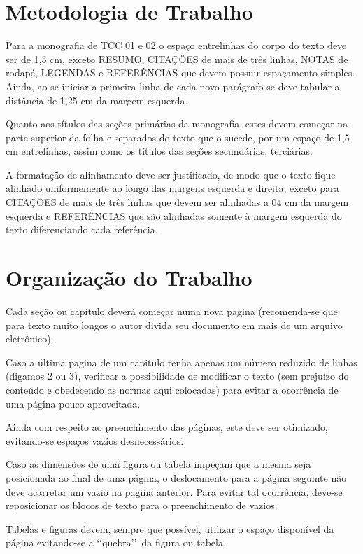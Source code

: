 \section{Metodologia de Trabalho}

Para a monografia de TCC 01 e 02 o espaço entrelinhas do corpo do texto 
deve ser de 1,5 cm, exceto RESUMO, CITAÇÔES de mais de três linhas, NOTAS 
de rodapé, LEGENDAS e REFERÊNCIAS que devem possuir espaçamento simples. 
Ainda, ao se iniciar a primeira linha de cada novo parágrafo se deve 
tabular a distância de 1,25 cm da margem esquerda.

Quanto aos títulos das seções primárias da monografia, estes devem começar 
na parte superior da folha e separados do texto que o sucede, por um espaço 
de 1,5 cm entrelinhas, assim como os títulos das seções secundárias, 
terciárias. 

A formatação de alinhamento deve ser justificado, de modo que o texto fique 
alinhado uniformemente ao longo das margens esquerda e direita, exceto para 
CITAÇÕES de mais de três linhas que devem ser alinhadas a 04 cm da margem 
esquerda e REFERÊNCIAS que são alinhadas somente à margem esquerda do texto 
diferenciando cada referência.

\section{Organização do Trabalho}

Cada seção ou capítulo deverá começar numa nova pagina (recomenda-se que 
para texto muito longos o autor divida seu documento em mais de um arquivo 
eletrônico). 

Caso a última pagina de um capitulo tenha apenas um número reduzido de 
linhas (digamos 2 ou 3), verificar a possibilidade de modificar o texto 
(sem prejuízo do conteúdo e obedecendo as normas aqui colocadas) para 
evitar a ocorrência de uma página pouco aproveitada.

Ainda com respeito ao preenchimento das páginas, este deve ser otimizado, 
evitando-se espaços vazios desnecessários. 

Caso as dimensões de uma figura ou tabela impeçam que a mesma seja 
posicionada ao final de uma página, o deslocamento para a página seguinte 
não deve acarretar um vazio na pagina anterior. Para evitar tal ocorrência, 
deve-se reposicionar os blocos de texto para o preenchimento de vazios. 

Tabelas e figuras devem, sempre que possível, utilizar o espaço disponível 
da página evitando-se a \lq\lq quebra\rq\rq\ da figura ou tabela. 

